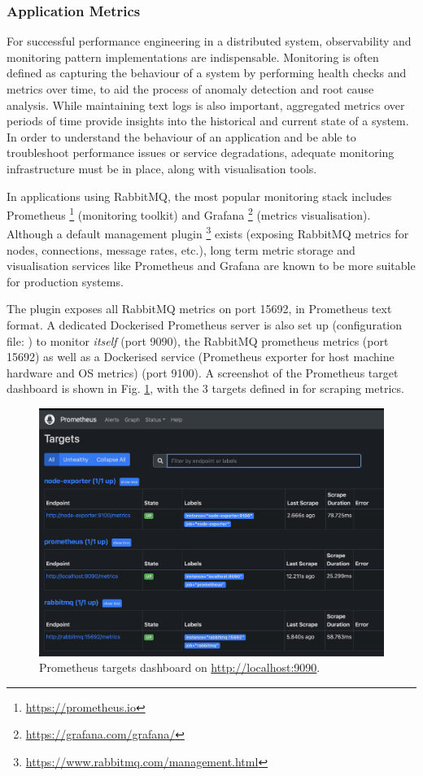 \subsubsection{Application Metrics}

For successful performance engineering in a distributed system, observability and monitoring pattern implementations are indispensable. Monitoring is often defined as capturing the behaviour of a system by performing health checks and metrics over time, to aid the process of anomaly detection and root cause analysis. While maintaining text logs is also important, aggregated metrics over periods of time provide insights into the historical and current state of a system. In order to understand the behaviour of an application and be able to troubleshoot performance issues or service degradations, adequate monitoring infrastructure must be in place, along with visualisation tools.

In applications using RabbitMQ, the most popular monitoring stack includes Prometheus \footnote{\url{https://prometheus.io}} (monitoring toolkit) and Grafana \footnote{\url{https://grafana.com/grafana/}} (metrics visualisation). Although a default management plugin \footnote{\url{https://www.rabbitmq.com/management.html}} exists (exposing RabbitMQ metrics for nodes, connections, message rates, etc.), long term metric storage and visualisation services like Prometheus and Grafana are known to be more suitable for production systems.

The  plugin exposes all RabbitMQ metrics on port 15692, in Prometheus text format. A dedicated Dockerised Prometheus server is also set up (configuration file: ) to monitor \textit{itself} (port 9090), the RabbitMQ prometheus metrics (port 15692) as well as a Dockerised  service (Prometheus exporter for host machine hardware and OS metrics) (port 9100). A screenshot of the Prometheus target dashboard is shown in Fig.
\ref{fig:prom-targets}, with the 3 targets defined in  for scraping metrics.

\begin{figure}[H]
	\centering
	\includegraphics[width=0.75\linewidth]{./assets/images/case-studies/prom-targets.png}
	\caption{Prometheus targets dashboard on \url{http://localhost:9090}.}
	\label{fig:prom-targets}
\end{figure}

